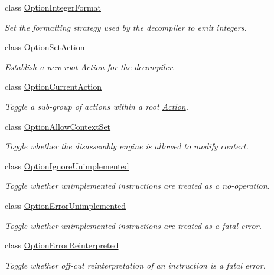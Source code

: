 \begin{DoxyCompactItemize}
class \mbox{\hyperlink{class_option_integer_format}{Option\+Integer\+Format}}
\begin{DoxyCompactList}\small\item\em Set the formatting strategy used by the decompiler to emit integers. \end{DoxyCompactList}\item 
class \mbox{\hyperlink{class_option_set_action}{Option\+Set\+Action}}
\begin{DoxyCompactList}\small\item\em Establish a new root \mbox{\hyperlink{class_action}{Action}} for the decompiler. \end{DoxyCompactList}\item 
class \mbox{\hyperlink{class_option_current_action}{Option\+Current\+Action}}
\begin{DoxyCompactList}\small\item\em Toggle a sub-\/group of actions within a root \mbox{\hyperlink{class_action}{Action}}. \end{DoxyCompactList}\item 
class \mbox{\hyperlink{class_option_allow_context_set}{Option\+Allow\+Context\+Set}}
\begin{DoxyCompactList}\small\item\em Toggle whether the disassembly engine is allowed to modify context. \end{DoxyCompactList}\item 
class \mbox{\hyperlink{class_option_ignore_unimplemented}{Option\+Ignore\+Unimplemented}}
\begin{DoxyCompactList}\small\item\em Toggle whether unimplemented instructions are treated as a {\itshape no-\/operation}. \end{DoxyCompactList}\item 
class \mbox{\hyperlink{class_option_error_unimplemented}{Option\+Error\+Unimplemented}}
\begin{DoxyCompactList}\small\item\em Toggle whether unimplemented instructions are treated as a fatal error. \end{DoxyCompactList}\item 
class \mbox{\hyperlink{class_option_error_reinterpreted}{Option\+Error\+Reinterpreted}}
\begin{DoxyCompactList}\small\item\em Toggle whether off-\/cut reinterpretation of an instruction is a fatal error. \end{DoxyCompactList}\item 

\end{DoxyCompactItemize}
